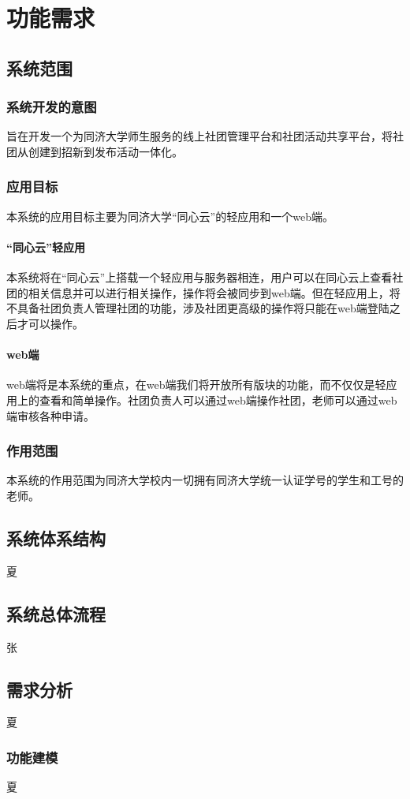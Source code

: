 \documentclass[UTF8]{ctexart}
\begin{document}
\section{功能需求}
\subsection{系统范围}
\subsubsection{系统开发的意图}
旨在开发一个为同济大学师生服务的线上社团管理平台和社团活动共享平台，将社团从创建到招新到发布活动一体化。
\subsubsection{应用目标}
本系统的应用目标主要为同济大学“同心云”的轻应用和一个web端。
\paragraph{“同心云”轻应用}
本系统将在“同心云”上搭载一个轻应用与服务器相连，用户可以在同心云上查看社团的相关信息并可以进行相关操作，操作将会被同步到web端。但在轻应用上，将不具备社团负责人管理社团的功能，涉及社团更高级的操作将只能在web端登陆之后才可以操作。
\paragraph{web端}
web端将是本系统的重点，在web端我们将开放所有版块的功能，而不仅仅是轻应用上的查看和简单操作。社团负责人可以通过web端操作社团，老师可以通过web端审核各种申请。

\subsubsection{作用范围}
本系统的作用范围为同济大学校内一切拥有同济大学统一认证学号的学生和工号的老师。
\subsection{系统体系结构}
夏
\subsection{系统总体流程}
张
\subsection{需求分析}
夏
\subsubsection{功能建模}
夏
\end{document}
